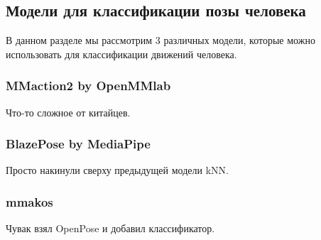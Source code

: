 \subsection{Модели для классификации позы человека}

В данном разделе мы рассмотрим 3 различных модели, которые можно использовать для классификации движений человека. 

\subsubsection{MMaction2 by OpenMMlab}

Что-то сложное от китайцев.

\subsubsection{BlazePose by MediaPipe}

Просто накинули сверху предыдущей модели kNN.

\subsubsection{mmakos}

Чувак взял OpenPose и добавил классификатор.


\newpage